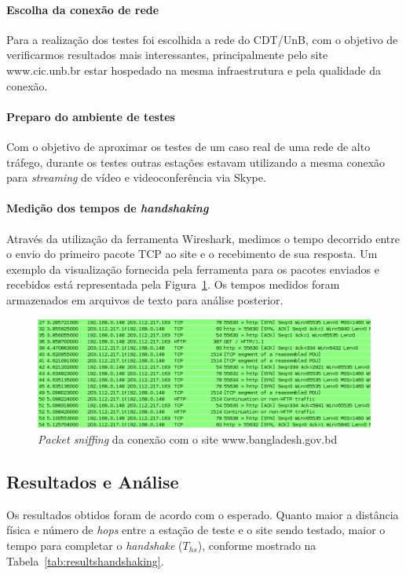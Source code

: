 \documentclass[12pt,a4paper]{report}
\begin{document}
\paragraph{Escolha da conexão de rede} Para a realização dos testes foi escolhida a rede do CDT/UnB, com o objetivo de verificarmos resultados mais interessantes, principalmente pelo site www.cic.unb.br estar hospedado na mesma infraestrutura e pela qualidade da conexão.

\paragraph{Preparo do ambiente de testes} Com o objetivo de aproximar os testes de um caso real de uma rede de alto tráfego, durante os testes outras estações estavam utilizando a mesma conexão para \textit{streaming} de vídeo e videoconferência via Skype.

\paragraph{Medição dos tempos de \textit{handshaking}} Através da utilização da ferramenta Wireshark, medimos o tempo decorrido entre o envio do primeiro pacote TCP ao site e o recebimento de sua resposta. Um exemplo da visualização fornecida pela ferramenta para os pacotes enviados e recebidos está representada pela Figura~\ref{fig:wirebangladesh}. Os tempos medidos foram armazenados em arquivos de texto para análise posterior.

\begin{figure}[h]
\centering
\includegraphics[width=\textwidth]{bangladesh.png}
\caption{\textit{Packet sniffing} da conexão com o site www.bangladesh.gov.bd}
\label{fig:wirebangladesh}
\end{figure}

\subsection{Resultados e Análise}

Os resultados obtidos foram de acordo com o esperado. Quanto maior a distância física e número de \textit{hops} entre a estação de teste e o site sendo testado, maior o tempo para completar o \textit{handshake} (\(T_{hs}\)), conforme mostrado na Tabela~\ref{tab:resultshandshaking}.
\end{document}
